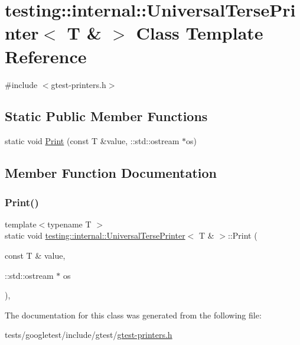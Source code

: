 \hypertarget{classtesting_1_1internal_1_1UniversalTersePrinter_3_01T_01_6_01_4}{}\section{testing\+:\+:internal\+:\+:Universal\+Terse\+Printer$<$ T \& $>$ Class Template Reference}
\label{classtesting_1_1internal_1_1UniversalTersePrinter_3_01T_01_6_01_4}


{\ttfamily \#include $<$gtest-\/printers.\+h$>$}

\subsection*{Static Public Member Functions}
\begin{DoxyCompactItemize}
\item 
static void \hyperlink{classtesting_1_1internal_1_1UniversalTersePrinter_3_01T_01_6_01_4_a931f93cc52a3046706c87d0a90640483}{Print} (const T \&value, \+::std\+::ostream $\ast$os)
\end{DoxyCompactItemize}


\subsection{Member Function Documentation}
\mbox{\label{classtesting_1_1internal_1_1UniversalTersePrinter_3_01T_01_6_01_4_a931f93cc52a3046706c87d0a90640483}} 
\subsubsection{\texorpdfstring{Print()}{Print()}}
{\footnotesize\ttfamily template$<$typename T $>$ \\
static void \hyperlink{classtesting_1_1internal_1_1UniversalTersePrinter}{testing\+::internal\+::\+Universal\+Terse\+Printer}$<$ T \& $>$\+::Print (\begin{DoxyParamCaption}\item[{const T \&}]{value,  }\item[{\+::std\+::ostream $\ast$}]{os }\end{DoxyParamCaption})\hspace{0.3cm}{\ttfamily [inline]}, {\ttfamily [static]}}



The documentation for this class was generated from the following file\+:\begin{DoxyCompactItemize}
\item 
tests/googletest/include/gtest/\hyperlink{gtest-printers_8h}{gtest-\/printers.\+h}\end{DoxyCompactItemize}
